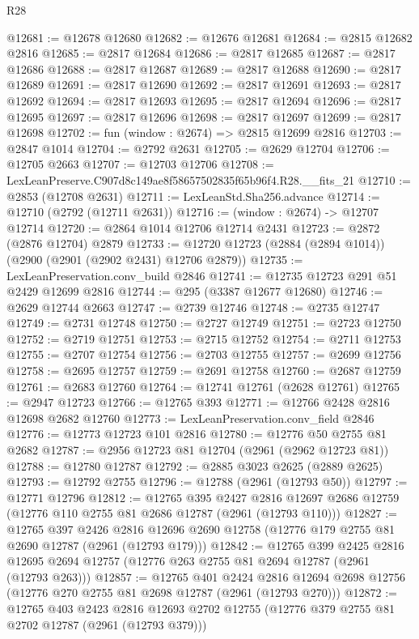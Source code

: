 \begin{lexlean}{R28}
\begin{coremodule}
@12681 := @12678 @12680
@12682 := @12676 @12681
@12684 := @2815 @12682 @2816
@12685 := @2817 @12684
@12686 := @2817 @12685
@12687 := @2817 @12686
@12688 := @2817 @12687
@12689 := @2817 @12688
@12690 := @2817 @12689
@12691 := @2817 @12690
@12692 := @2817 @12691
@12693 := @2817 @12692
@12694 := @2817 @12693
@12695 := @2817 @12694
@12696 := @2817 @12695
@12697 := @2817 @12696
@12698 := @2817 @12697
@12699 := @2817 @12698
@12702 := fun (window : @2674) => @2815 @12699 @2816
@12703 := @2847 @1014
@12704 := @2792 @2631
@12705 := @2629 @12704
@12706 := @12705 @2663
@12707 := @12703 @12706
@12708 := LexLeanPreserve.C907d8c149ae8f58657502835f65b96f4.R28.__fits_21
@12710 := @2853 (@12708 @2631)
@12711 := LexLeanStd.Sha256.advance
@12714 := @12710 (@2792 (@12711 @2631))
@12716 := (window : @2674) -> @12707 @12714
@12720 := @2864 @1014 @12706 @12714 @2431
@12723 := @2872 (@2876 @12704) @2879
@12733 := @12720 @12723 (@2884 (@2894 @1014)) (@2900 (@2901 (@2902 @2431) @12706 @2879))
@12735 := LexLeanPreservation.conv_build @2846
@12741 := @12735 @12723 @291 @51 @2429 @12699 @2816
@12744 := @295 (@3387 @12677 @12680)
@12746 := @2629 @12744 @2663
@12747 := @2739 @12746
@12748 := @2735 @12747
@12749 := @2731 @12748
@12750 := @2727 @12749
@12751 := @2723 @12750
@12752 := @2719 @12751
@12753 := @2715 @12752
@12754 := @2711 @12753
@12755 := @2707 @12754
@12756 := @2703 @12755
@12757 := @2699 @12756
@12758 := @2695 @12757
@12759 := @2691 @12758
@12760 := @2687 @12759
@12761 := @2683 @12760
@12764 := @12741 @12761 (@2628 @12761)
@12765 := @2947 @12723
@12766 := @12765 @393
@12771 := @12766 @2428 @2816 @12698 @2682 @12760
@12773 := LexLeanPreservation.conv_field @2846
@12776 := @12773 @12723 @101 @2816
@12780 := @12776 @50 @2755 @81 @2682
@12787 := @2956 @12723 @81 @12704 (@2961 (@2962 @12723 @81))
@12788 := @12780 @12787
@12792 := @2885 @3023 @2625 (@2889 @2625)
@12793 := @12792 @2755
@12796 := @12788 (@2961 (@12793 @50))
@12797 := @12771 @12796
@12812 := @12765
    @395
    @2427
    @2816
    @12697
    @2686
    @12759
    (@12776 @110 @2755 @81 @2686 @12787 (@2961 (@12793 @110)))
@12827 := @12765
    @397
    @2426
    @2816
    @12696
    @2690
    @12758
    (@12776 @179 @2755 @81 @2690 @12787 (@2961 (@12793 @179)))
@12842 := @12765
    @399
    @2425
    @2816
    @12695
    @2694
    @12757
    (@12776 @263 @2755 @81 @2694 @12787 (@2961 (@12793 @263)))
@12857 := @12765
    @401
    @2424
    @2816
    @12694
    @2698
    @12756
    (@12776 @270 @2755 @81 @2698 @12787 (@2961 (@12793 @270)))
@12872 := @12765
    @403
    @2423
    @2816
    @12693
    @2702
    @12755
    (@12776 @379 @2755 @81 @2702 @12787 (@2961 (@12793 @379)))

\end{coremodule}
\end{lexlean}
